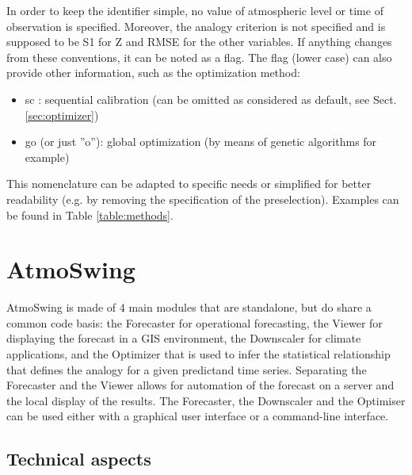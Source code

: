 \documentclass[gmdd]{copernicus}
\begin{document}
In order to keep the identifier simple, no value of atmospheric level or time of observation is specified. Moreover, the analogy criterion is not specified and is supposed to be S1 for Z and RMSE for the other variables. If anything changes from these conventions, it can be noted as a flag. The flag (lower case) can also provide other information, such as the optimization method:
\begin{itemize}
	\item sc : sequential calibration (can be omitted as considered as default, see Sect. \ref{sec:optimizer})
	\item go (or just ''o''): global optimization (by means of genetic algorithms for example)
\end{itemize}

This nomenclature can be adapted to specific needs or simplified for better readability (e.g. by removing the specification of the preselection). Examples can be found in Table \ref{table:methods}.


\section{AtmoSwing}
\label{sec:atmoswing}

AtmoSwing is made of 4 main modules that are standalone, but do share a common code basis: the Forecaster for operational forecasting, the Viewer for displaying the forecast in a GIS environment, the Downscaler for climate applications, and the Optimizer that is used to infer the statistical relationship that defines the analogy for a given predictand time series. Separating the Forecaster and the Viewer allows for automation of the forecast on a server and the local display of the results. The Forecaster, the Downscaler and the Optimiser can be used either with a graphical user interface or a command-line interface.


\subsection{Technical aspects}
\end{document}
